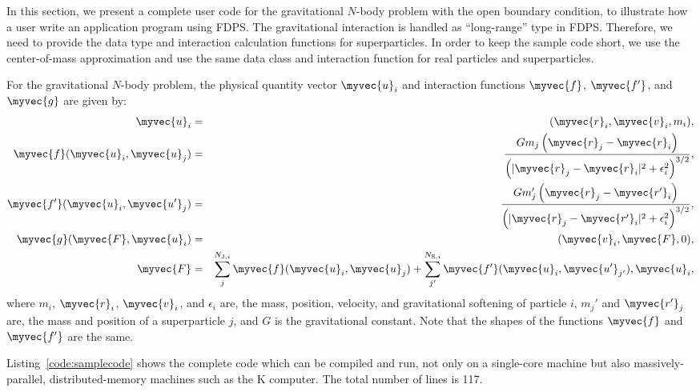 In this section, we present a complete user code for the gravitational
$N$-body problem with the open boundary condition, to illustrate how a
user write an application program using FDPS.  The gravitational
interaction is handled as ``long-range'' type in FDPS. Therefore, we
need to provide the data type and interaction calculation functions
for superparticles. In order to keep the sample code short, we use the
center-of-mass approximation and use the same data class and
interaction function for real particles and superparticles.


For the gravitational
$N$-body problem, the physical quantity vector $\myvec{u}_i$ and interaction functions
$\myvec{f}$, $\myvec{f'}$, and $\myvec{g}$ are given by:
\begin{eqnarray}
  \myvec{u}_i &=& (\myvec{r}_i,
  \myvec{v}_i,m_i), \label{eq:PhysicalVectorNbody} \\
  \myvec{f} (\myvec{u}_i, \myvec{u}_j) &=& \frac{Gm_j \left(
    \myvec{r}_j - \myvec{r}_i \right)}{ \left( |\myvec{r}_j -
    \myvec{r}_i|^2 + \epsilon_i^2
    \right)^{3/2}}, \label{eq:ParticleParticleNbody} \\
  \myvec{f'} (\myvec{u}_i, \myvec{u'}_j) &=& \frac{Gm_j' \left(
    \myvec{r}_j - \myvec{r'}_i \right)}{ \left( |\myvec{r}_j -
    \myvec{r'}_i|^2 + \epsilon_i^2
    \right)^{3/2}}, \label{eq:ParticleSuperparticleNbody} \\
  \myvec{g}(\myvec{F},\myvec{u}_i)  &=& (\myvec{v}_i,\myvec{F},0), \\
  \myvec{F} &=& \sum_j^{N_{\mathrm{J},i}}
  \myvec{f}(\myvec{u}_i,\myvec{u}_j) + \sum_{j'}^{N_{\mathrm{S},i}}
  \myvec{f'}(\myvec{u}_i,\myvec{u'}_{j'}), \myvec{u}_i,
\label{eq:ConversionNbody}
\end{eqnarray}
where $m_i$, $\myvec{r}_i$, $\myvec{v}_i$, and $\epsilon_i$ are, the
mass, position, velocity, and gravitational softening of particle $i$,
$m_j'$ and $\myvec{r'}_j$ are, the mass and position of a
superparticle $j$, and $G$ is the gravitational constant.  Note that
the shapes of the functions $\myvec{f}$ and $\myvec{f'}$ are the same.

Listing~\ref{code:samplecode} shows the complete code which can be
compiled and run, not only on a single-core machine but also
massively-parallel, distributed-memory machines such as the  K
computer. The total number of lines is 117.




